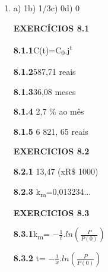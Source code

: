 \documentclass[12pt]{article}
\begin{document}

\par


\vspace{\baselineskip}
\begin{enumerate}
	\item  a) 1\tab \tab b) 1/3\tab \tab c) 0\tab \tab d) 0\par


\vspace{\baselineskip}
\setlength{\parskip}{8.04pt}
\setlength{\parskip}{0.0pt}
\textbf{EXERCÍCIOS 8.1}\par


\vspace{\baselineskip}
\textbf{8.1.1}\tab C(t)=C\textsubscript{0}.j\textsuperscript{t}\par

\textbf{8.1.2\tab }587,71 reais\par

\textbf{8.1.3\tab }36,08 meses\par

\textbf{8.1.4 \tab }2,7 $\%$  ao mês \par

\textbf{8.1.5\tab } 6 821, 65 reais\par


\vspace{\baselineskip}
\textbf{EXERCICIOS 8.2}\par


\vspace{\baselineskip}
\textbf{8.2.1 \tab }13,47 (xR$\$$ 1000)\par

\textbf{8.2.3 \tab }k\textsubscript{m}=0,013234...\par


\vspace{\baselineskip}
\textbf{EXERCICIOS 8.3}\par


\vspace{\baselineskip}
\textbf{8.3.1\tab }k\textsubscript{m}=  \( -\frac{1}{t} . ln⁡ \left( \frac{P}{P \left( 0 \right) } \right)  \)  \par

\textbf{8.3.2 \tab }t=  \( -\frac{1}{x} .ln \left( \frac{P}{P \left( 0 \right) } \right)  \) \par


\vspace{\baselineskip}
\setlength{\parskip}{8.04pt}

\end{enumerate}
\printbibliography
\end{document}
